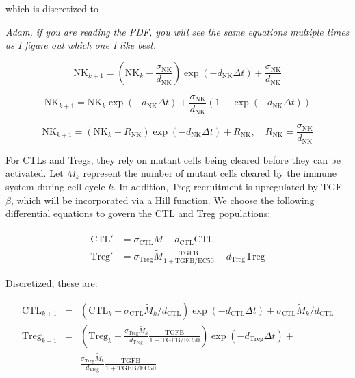 \documentclass{article}
\begin{document}
which is discretized to

\emph{Adam, if you are reading the PDF, you will see the same equations multiple times as I figure out which one I like best.}

$$ \text{NK}_{k+1} = \left (\text{NK}_k-\frac{\sigma_{\text{NK}}}{d_{\text{NK}}} \right )\exp(-d_{\text{NK}}\Delta t)+\frac{\sigma_{\text{NK}}}{d_{\text{NK}}} $$

$$ \text{NK}_{k+1} = \text{NK}_k\exp(-d_{\text{NK}}\Delta t)+\frac{\sigma_{\text{NK}}}{d_{\text{NK}}} \left(1-\exp(-d_{\text{NK}}\Delta t)\right)$$

$$\text{NK}_{k+1} = (\text{NK}_k-R_\text{NK})\exp(-d_\text{NK}\Delta t)+R_\text{NK},\quad R_\text{NK}=\frac{\sigma_\text{NK}}{d_\text{NK}}$$





For CTLs and Tregs, they rely on mutant cells being cleared before they can be activated.
Let $\tilde{M}_k$ represent the number of mutant cells cleared by the immune system during cell cycle $k$.
In addition, Treg recruitment is upregulated by TGF-$\beta$, which will be incorporated via a Hill function.
We choose the following differential equations to govern the CTL and Treg populations:

\begin{align*}
\text{CTL}' & = \sigma_{\text{CTL}}\tilde{M} - d_{\text{CTL}}\text{CTL} \\
\text{Treg}' & = \sigma_{\text{Treg}}\tilde{M} \frac{\text{TGFB}}{1+\text{TGFB}/\text{EC50}}- d_{\text{Treg}}\text{Treg}
\end{align*}

Discretized, these are:

\begin{align*}
\text{CTL}_{k+1} & = & \left (\text{CTL}_k-\sigma_{\text{CTL}}\tilde{M}_k/d_{\text{CTL}}\right )\exp(- d_{\text{CTL}}\Delta t) + \sigma_{\text{CTL}}\tilde{M}_k/d_{\text{CTL}}\\
\text{Treg}_{k+1} & = & \left (\text{Treg}_k-\frac{\sigma_{\text{Treg}}\tilde{M}_k}{d_{\text{Treg}}} \frac{\text{TGFB}}{1+\text{TGFB}/\text{EC50}}\right )\exp(-d_{\text{Treg}}\Delta t)+\\
& & \frac{\sigma_{\text{Treg}}\tilde{M}_k}{d_{\text{Treg}}} \frac{\text{TGFB}}{1+\text{TGFB}/\text{EC50}}
\end{align*}
\end{document}
